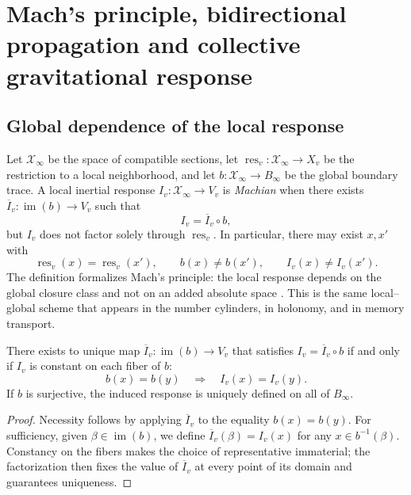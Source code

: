 \section{Mach's principle, bidirectional propagation and collective gravitational response}
\label{chap:mach-onda-bidireccional-rev10}

\subsection{Global dependence of the local response}

Let \(\mathcal X_\infty\) be the space of compatible sections, let
\(\operatorname{res}_v:\mathcal X_\infty\to X_v\) be the restriction to a
local neighborhood, and let \(b:\mathcal X_\infty\to B_\infty\) be the global
boundary trace. A local inertial response \(I_v:\mathcal X_\infty\to V_v\)
is \emph{Machian} when there exists
\(\overline I_v:\operatorname{im}(b)\to V_v\) such that
\begin{equation}
 I_v=\overline I_v\circ b,
 \label{eq:factorizacion-mach-rev10}
\end{equation}
but \(I_v\) does not factor solely through
\(\operatorname{res}_v\). In particular, there may exist \(x,x'\) with
\[
 \operatorname{res}_v(x)=\operatorname{res}_v(x'),\qquad
 b(x)\ne b(x'),\qquad I_v(x)\ne I_v(x').
\]
The definition formalizes Mach's principle: the local response depends on
the global closure class and not on an added absolute space
\cite{MachMechanics}. This is the same local--global scheme that appears in the
number cylinders, in holonomy, and in memory transport.

\begin{theorem}
\label{thm:criterio-factorizacion-machiana-rev2}
There exists to unique map
\(\overline I_v:\operatorname{im}(b)\to V_v\) that satisfies
\(I_v=\overline I_v\circ b\) if and only if \(I_v\) is constant on each
fiber of \(b\):
\[
 b(x)=b(y)\quad\Longrightarrow\quad I_v(x)=I_v(y).
\]
If \(b\) is surjective, the induced response is uniquely defined
on all of \(B_\infty\).
\end{theorem}

\begin{proof}
Necessity follows by applying \(\overline I_v\) to the equality \(b(x)=b(y)\). For sufficiency, given \(\beta\in\operatorname{im}(b)\), we define \(\overline I_v(\beta)=I_v(x)\) for any \(x\in b^{-1}(\beta)\). Constancy on the fibers makes the choice of representative immaterial; the factorization then fixes the value of \(\overline I_v\) at every point of its domain and guarantees uniqueness.
\end{proof}

